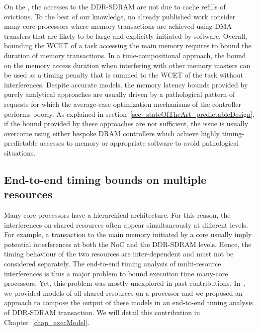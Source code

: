\documentclass[main.tex]{subfiles}
\begin{document}
On the \mppalong, the accesses to the DDR-SDRAM are not due to cache refills of evictions. To the best of our knowledge, no already published work consider many-core processors where memory transactions are achieved using DMA transfers that are likely to be large and explicitly initiated by software. 
Overall, bounding the WCET of a task accessing the main memory requires to bound the duration of memory transactions. In a time-compositional approach, the bound on the memory access duration when interfering with other memory masters can be used as a timing penalty that is summed to the WCET of the task without interferences. Despite accurate models, the memory latency bounds provided by purely analytical approaches are usually driven by a pathological pattern of requests for which the average-case optimization mechanisms of the controller performs poorly. As explained in section~\ref{sec_stateOfTheArt_predictableDesign}, if the bound provided by these approaches are not sufficient, the issue is usually overcome using either bespoke DRAM controllers which achieve highly timing-predictable accesses to memory or appropriate software to avoid pathological situations.





\subsection{End-to-end timing bounds on multiple resources}
Many-core processors have a hierarchical architecture. For this reason, the interferences on shared resources often appear simultaneously at different levels. For example, a transaction to the main memory initiated by a core usually imply potential interferences at both the NoC and the DDR-SDRAM levels. Hence, the timing behaviour of the two resources are inter-dependent and must not be considered separately. The end-to-end timing analysis of multi-resource interferences is thus a major problem to bound execution time many-core processors. Yet, this problem was mostly unexplored in past contributions. In~\cite{Perret16}, we provided models of all shared resources on a \mppalong processor and we proposed an approach to compose the output of these models in an end-to-end timing analysis of DDR-SDRAM transaction. We will detail this contribution in Chapter~\ref{chap_execModel}.
\end{document}
